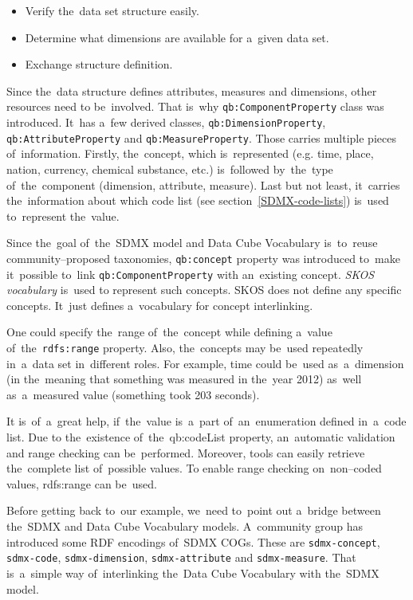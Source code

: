 \begin{itemize}
\item Verify the~data set structure easily.
\item Determine what dimensions are available for a~given data set.
\item Exchange structure definition.
\end{itemize}

\begin{sloppypar}
Since the~data structure defines attributes, measures and dimensions, other resources need
to be~involved. That is~why \texttt{qb:ComponentProperty} class was introduced. It~has a~few derived
classes, \texttt{qb:DimensionProperty}, \texttt{qb:AttributeProperty}
and \texttt{qb:MeasureProperty}. Those carries
multiple pieces of~information. Firstly, the~concept, which is~represented (e.g. time, place,
nation, currency, chemical substance, etc.) is~followed by~the~type of~the~component
(dimension, attribute, measure). Last but not least, it~carries the~information about which
code list (see section~\ref{SDMX-code-lists}) is~used to~represent the~value.
\end{sloppypar}

Since the~goal of~the~SDMX model and Data Cube Vocabulary is~to~reuse community--proposed
taxonomies, \texttt{qb:concept} property was introduced to~make it~possible to~link
\texttt{qb:ComponentProperty} with an~existing concept. \emph{SKOS vocabulary} is~used to
represent such concepts. SKOS does not define any specific concepts. It~just defines
a~vocabulary for concept interlinking.

One could specify the~range of~the~concept while defining a~value of~the~\texttt{rdfs:range} property.
Also, the~concepts may be~used repeatedly in~a~data set in~different roles.
For example, time could be~used as~a~dimension (in the~meaning that something was measured
in the~year 2012) as~well as~a~measured value (something took 203 seconds).

It is~of~a~great help, if~the~value is~a~part of~an~enumeration defined in~a~code list. Due to
the~existence of~the~qb:codeList property, an~automatic validation and range checking
can be~performed. Moreover, tools can easily retrieve the~complete list of~possible values.
To enable range checking on~non--coded values, rdfs:range can be~used.

\begin{sloppypar}
Before getting back to~our example, we~need to~point out a~bridge between the~SDMX
and Data Cube Vocabulary models. A~community group has introduced some RDF 
encodings of~SDMX COGs. These are \texttt{sdmx-concept}, \texttt{sdmx-code}, \texttt{sdmx-dimension},
\texttt{sdmx-attribute} and \texttt{sdmx-measure}. That is~a~simple way of~interlinking the~Data Cube
Vocabulary with the~SDMX model.
\end{sloppypar}

